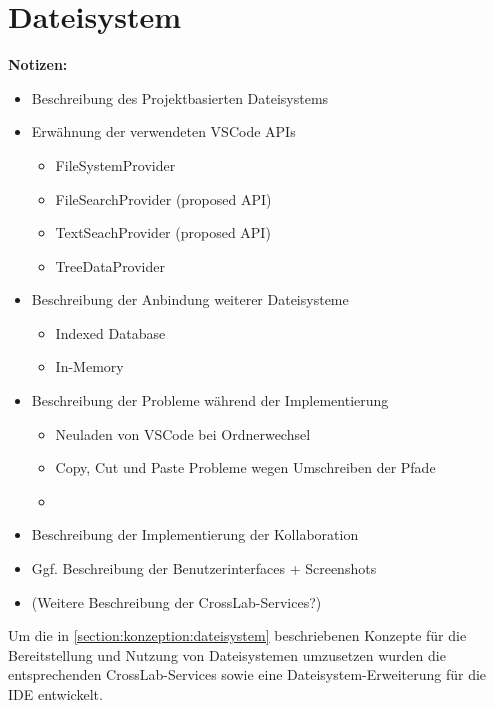 \section{Dateisystem}\label{section:prototypische-implementierung:dateisystem}

\begin{note}
    \textbf{Notizen:}
    \begin{itemize}
        \item Beschreibung des Projektbasierten Dateisystems
        \item Erwähnung der verwendeten VSCode APIs
              \begin{itemize}
                  \item FileSystemProvider
                  \item FileSearchProvider (proposed API)
                  \item TextSeachProvider (proposed API)
                  \item TreeDataProvider
              \end{itemize}
        \item Beschreibung der Anbindung weiterer Dateisysteme
              \begin{itemize}
                  \item Indexed Database
                  \item In-Memory
              \end{itemize}
        \item Beschreibung der Probleme während der Implementierung
              \begin{itemize}
                  \item Neuladen von VSCode bei Ordnerwechsel
                  \item Copy, Cut und Paste Probleme wegen Umschreiben der Pfade
                  \item
              \end{itemize}
        \item Beschreibung der Implementierung der Kollaboration
        \item Ggf. Beschreibung der Benutzerinterfaces + Screenshots
        \item (Weitere Beschreibung der CrossLab-Services?)
    \end{itemize}
\end{note}

Um die in \autoref{section:konzeption:dateisystem} beschriebenen Konzepte für die Bereitstellung und Nutzung von Dateisystemen umzusetzen wurden die entsprechenden CrossLab-Services sowie eine Dateisystem-Erweiterung für die IDE entwickelt.

